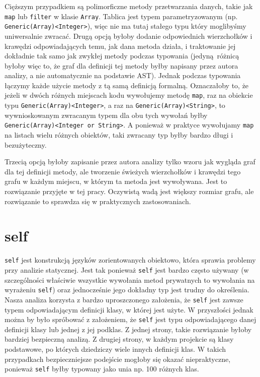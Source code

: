 \documentclass[shortabstract,mgr]{iithesis}
\begin{document}
Cięższym przypadkiem są polimorficzne metody przetwarzania danych, takie jak \texttt{map} lub \texttt{filter} w klasie \texttt{Array}. Tablica jest typem parametryzowanym (np. \texttt{Generic(Array)<Integer>}), więc nie ma tutaj stałego typu który moglibyśmy uniwersalnie zwracać. Drugą opcją byłoby dodanie odpowiednich wierzchołków i krawędzi odpowiadających temu, jak dana metoda działa, i traktowanie jej dokładnie tak samo jak zwykłej metody podczas typowania (jedyną różnicą byłoby więc to, że graf dla definicji tej metody byłby napisany przez autora analizy, a nie automatycznie na podstawie AST). Jednak podczas typowania łączymy każde użycie metody z tą samą definicją formalną. Oznaczałoby to, że jeżeli w dwóch różnych miejscach kodu wywołujemy metodę \texttt{map}, raz na obiekcie typu \texttt{Generic(Array)<Integer>}, a raz na \texttt{Generic(Array)<String>}, to wywnioskowanym zwracanym typem dla obu tych wywołań byłby \texttt{Generic(Array)<Integer or String>}. A ponieważ w praktyce wywołujamy \texttt{map} na listach wielu różnych obiektów, taki zwracany typ byłby bardzo długi i bezużyteczny.

Trzecią opcją byłoby zapisanie przez autora analizy tylko wzoru jak wygląda graf dla tej definicji metody, ale tworzenie świeżych wierzchołków i krawędzi tego grafu w każdym miejscu, w którym ta metoda jest wywoływana. Jest to rozwiązanie przyjęte w tej pracy. Oczywistą wadą jest większy rozmiar grafu, ale rozwiązanie to sprawdza się w praktycznych zastosowaniach.

\section{self}

\texttt{self} jest konstrukcją języków zorientowanych obiektowo, która sprawia problemy przy analizie statycznej.
Jest tak ponieważ \texttt{self} jest bardzo często używany (w szczególności właściwie wszystkie wywołania metod prywatnych to wywołania na wyrażeniu \texttt{self}) oraz jednocześnie jego dokładny typ jest trudny do określenia. Nasza analiza korzysta z bardzo uproszczonego założenia, że \texttt{self} jest zawsze typem odpowiadającym definicji klasy, w której jest użyte. W przyszłości jednak można by było spróbować z założeniem, że \texttt{self} jest typu odpowiadającego danej definicji klasy lub jednej z jej podklas. Z jednej strony, takie rozwiązanie byłoby bardziej bezpieczną analizą. Z drugiej strony, w każdym projekcie są klasy podstawowe, po których dziedziczy wiele innych definicji klas. W takich przypadkach bezpieczniejsze podejście mogłoby się okazać niepraktyczne, ponieważ \texttt{self} byłby typowany jako unia np. 100 różnych klas.
\end{document}
